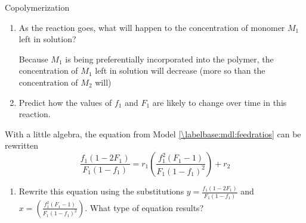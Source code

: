 \begin{activity}{Copolymerization}
\begin{ctqs}
\begin{enumerate}
			\item As the reaction goes, what will happen to the concentration of monomer $M_1$ left in solution?
				
				\begin{solution}[1in]
					Because $M_1$ is being preferentially incorporated into the polymer, the concentration of $M_1$ left in solution will decrease (more so than the concentration of $M_2$ will)
				\end{solution}
			\item Predict how the values of $f_1$ and $F_1$ are likely to change over time in this reaction.
				
				\begin{solution}[1in]\end{solution}
			
			
		\end{enumerate}
		
	\question \label{\labelbase:ctq:FinemanRoss} With a little algebra, the equation from Model \ref{\labelbase:mdl:feedratios} can be rewritten
		\begin{equation*}
			\frac{f_1(1-2F_1)}{F_1(1-f_1)} = r_1\left(\frac{f_1^2(F_1-1)}{F_1(1-f_1)^2}\right)+r_2
		\end{equation*}
		
		\begin{enumerate}
			\item Rewrite this equation using the substitutions $y=\frac{f_1(1-2F_1)}{F_1(1-f_1)}$ and $x=\left(\frac{f_1^2(F_1-1)}{F_1(1-f_1)^2}\right)$.  What type of equation results?
			
				\begin{solution}[1in]\end{solution}
			

\end{enumerate}
\end{ctqs}
\end{activity}
